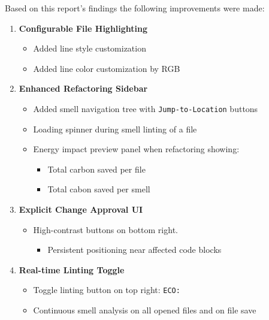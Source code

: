 \documentclass{article}
\begin{document}
Based on this report's findings the following improvements were made:

\begin{enumerate}
    \item \textbf{Configurable File Highlighting}
    \begin{itemize}
        \item Added line style customization
        \item Added line color customization by RGB
    \end{itemize}

    
    \item \textbf{Enhanced Refactoring Sidebar}
    \begin{itemize}
        \item Added smell navigation tree with \texttt{Jump-to-Location} buttons
        \item Loading spinner during smell linting of a file  
        \item Energy impact preview panel when refactoring showing:
        \begin{itemize}
            \item Total carbon saved per file
            \item Total cabon saved per smell
        \end{itemize}
    \end{itemize}
    
    \item \textbf{Explicit Change Approval UI}
    \begin{itemize}
        \item High-contrast buttons on bottom right. 
        \begin{itemize}
            \item Persistent positioning near affected code blocks
        \end{itemize}
    \end{itemize}

    
    
    \item \textbf{Real-time Linting Toggle}
    \begin{itemize}
        \item Toggle linting button on top right: \texttt{ECO: }
        \item Continuous smell analysis on all opened files and on file save
    \end{itemize}

\end{enumerate}
\end{document}
